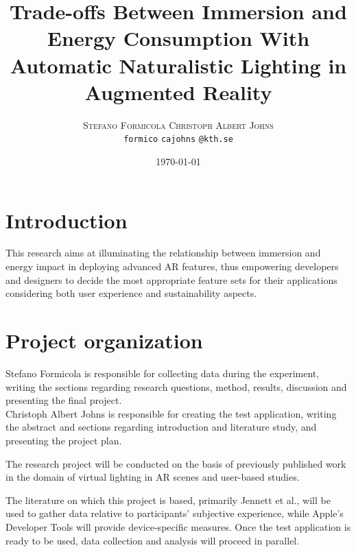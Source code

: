 \documentclass[12pt,twoside,english]{article}
\title{Trade-offs Between Immersion and Energy Consumption With Automatic Naturalistic Lighting in Augmented Reality}
\author{
        \textsc{Stefano Formicola}
            \qquad
        \textsc{Christoph Albert Johns}
        \mbox{}\\
        \normalsize
            \texttt{formico}
        \textbar{}
            \texttt{cajohns}
        \normalsize
            \texttt{@kth.se}
}
\date{\today}
\begin{document}
\maketitle






\section{Introduction}
\label{sect:introduction}

This research aims at illuminating the relationship between immersion and energy impact in deploying advanced \gls{AR} features, thus empowering developers and designers to decide the most appropriate feature sets for their applications considering both user experience and sustainability aspects.


\section{Project organization}
\label{sect:organization}

Stefano Formicola is responsible for collecting data during the experiment, writing the sections regarding research questions, method, results, discussion and presenting the final project.\\
Christoph Albert Johns is responsible for creating the test application, writing the abstract and sections regarding introduction and literature study, and presenting the project plan.

The research project will be conducted on the basis of previously published work in the domain of virtual lighting in \gls{AR} scenes and user-based studies.

The literature on which this project is based, primarily Jennett et al.\cite{jennett_measuring_2008}, will be used to gather data relative to participants' subjective experience, while Apple's Developer Tools will provide device-specific measures.
Once the test application is ready to be used, data collection and analysis will proceed in parallel.
\end{document}
